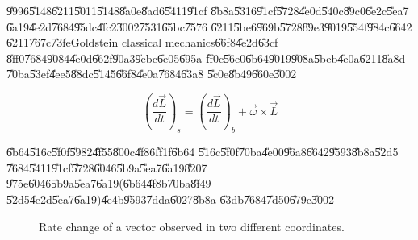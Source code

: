 \documentclass[12pt]{article}
\begin{document}
\U{9996}\U{5148}\U{6211}\U{5011}\U{5148}\U{8a0e}\U{8ad6}\U{5411}\U{91cf}%
\U{8b8a}\U{5316}\U{91cf}\U{5728}\U{4e0d}\U{540c}\U{89c0}\U{6e2c}\U{5ea7}%
\U{6a19}\U{4e2d}\U{7684}\U{95dc}\U{4fc2}\U{3002}\U{7531}\U{65bc}\U{7576}%
\U{6211}\U{5be6}\U{969b}\U{5728}\U{89e3}\U{9019}\U{554f}\U{984c}\U{6642}%
\U{6211}\U{767c}\U{73fe}Goldstein classical mechanics\U{66f8}\U{4e2d}\U{63cf}%
\U{8ff0}\U{7684}\U{9084}\U{4e0d}\U{662f}\U{90a3}\U{9ebc}\U{6e05}\U{695a}%
\U{ff0c}\U{56e0}\U{6b64}\U{9019}\U{908a}\U{5beb}\U{4e0a}\U{6211}\U{8a8d}%
\U{70ba}\U{53ef}\U{4ee5}\U{88dc}\U{5145}\U{66f8}\U{4e0a}\U{7684}\U{63a8}%
\U{5c0e}\U{8b49}\U{660e}\U{3002}

\begin{equation}
\left( \frac{d\vec{L}}{dt}\right) _{s}=\left( \frac{d\vec{L}}{dt}\right)
_{b}+\vec{\omega}\times \vec{L}
\end{equation}

\U{6b64}\U{516c}\U{5f0f}\U{5982}\U{4f55}\U{800c}\U{4f86}\U{ff1f}\U{6b64}%
\U{516c}\U{5f0f}\U{70ba}\U{4e00}\U{96a8}\U{6642}\U{9593}\U{8b8a}\U{52d5}%
\U{7684}\U{5411}\U{91cf}\U{5728}\U{6046}\U{5b9a}\U{5ea7}\U{6a19}\U{8207}%
\U{975e}\U{6046}\U{5b9a}\U{5ea7}\U{6a19}(\U{6b64}\U{4f8b}\U{70ba}\U{8f49}%
\U{52d5}\U{4e2d}\U{5ea7}\U{6a19})\U{4e4b}\U{9593}\U{7dda}\U{6027}\U{8b8a}%
\U{63db}\U{7684}\U{7d50}\U{679c}\U{3002}

\begin{figure}[th]
\caption{Rate change of a vector observed in two different coordinates.}
\begin{center}
\end{center}
\end{figure}
\bigskip
\end{document}
